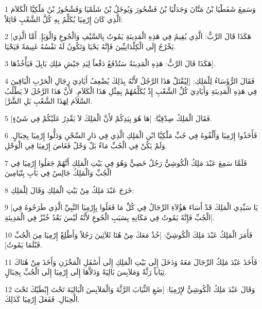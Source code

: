\par 1 وَسَمِعَ شَفَطْيَا بْنُ مَتَّانَ وَجَدَلْيَا بْنُ فَشْحُورَ وَيُوخَلُ بْنُ شَلَمْيَا وَفَشْحُورُ بْنُ مَلْكِيَّا الْكَلاَمَ الَّذِي كَانَ إِرْمِيَا يُكَلِّمُ بِهِ كُلَّ الشَّعْبِ قَائِلاً:
\par 2 [هَكَذَا قَالَ الرَّبُّ: الَّذِي يُقِيمُ فِي هَذِهِ الْمَدِينَةِ يَمُوتُ بِالسَّيْفِ وَالْجُوعِ وَالْوَبَإِ. أَمَّا الَّذِي يَخْرُجُ إِلَى الْكِلْدَانِيِّينَ فَإِنَّهُ يَحْيَا وَتَكُونُ لَهُ نَفْسُهُ غَنِيمَةً فَيَحْيَا.
\par 3 هَكَذَا قَالَ الرَّبُّ: هَذِهِ الْمَدِينَةُ سَتُدْفَعُ دَفْعاً لِيَدِ جَيْشِ مَلِكِ بَابِلَ فَيَأْخُذُهَا].
\par 4 فَقَالَ الرُّؤَسَاءُ لِلْمَلِكِ: [لِيُقْتَلْ هَذَا الرَّجُلُ لأَنَّهُ بِذَلِكَ يُضْعِفُ أَيَادِيَ رِجَالِ الْحَرْبِ الْبَاقِينَ فِي هَذِهِ الْمَدِينَةِ وَأَيَادِيَ كُلِّ الشَّعْبِ إِذْ يُكَلِّمُهُمْ بِمِثْلِ هَذَا الْكَلاَمِ. لأَنَّ هَذَا الرَّجُلَ لاَ يَطْلُبُ السَّلاَمَ لِهَذَا الشَّعْبِ بَلِ الشَّرَّ].
\par 5 فَقَالَ الْمَلِكُ صِدْقِيَّا: [هَا هُوَ بِيَدِكُمْ لأَنَّ الْمَلِكَ لاَ يَقْدِرُ عَلَيْكُمْ فِي شَيْءٍ].
\par 6 فَأَخَذُوا إِرْمِيَا وَأَلْقُوهُ فِي جُبِّ مَلْكِيَّا ابْنِ الْمَلِكِ الَّذِي فِي دَارِ السِّجْنِ وَدَلُّوا إِرْمِيَا بِحِبَالٍ. وَلَمْ يَكُنْ فِي الْجُبِّ مَاءٌ بَلْ وَحْلٌ فَغَاصَ إِرْمِيَا فِي الْوَحْلِ.
\par 7 فَلَمَّا سَمِعَ عَبْدَ مَلِكُ الْكُوشِيُّ رَجُلٌ خَصِيٌّ وَهُوَ فِي بَيْتِ الْمَلِكِ أَنَّهُمْ جَعَلُوا إِرْمِيَا فِي الْجُبِّ وَالْمَلِكُ جَالِسٌ فِي بَابِ بِنْيَامِينَ
\par 8 خَرَجَ عَبْدَ مَلِكُ مِنْ بَيْتِ الْمَلِكِ وَقَالَ لِلْمَلِكِ:
\par 9 [يَا سَيِّدِي الْمَلِكَ قَدْ أَسَاءَ هَؤُلاَءِ الرِّجَالُ فِي كُلِّ مَا فَعَلُوا بِإِرْمِيَا النَّبِيِّ الَّذِي طَرَحُوهُ فِي الْجُبِّ فَإِنَّهُ يَمُوتُ فِي مَكَانِهِ بِسَبَبِ الْجُوعِ لأَنَّهُ لَيْسَ بَعْدُ خُبْزٌ فِي الْمَدِينَةِ].
\par 10 فَأَمَرَ الْمَلِكُ عَبْدَ مَلِكَ الْكُوشِيَّ: [خُذْ مَعَكَ مِنْ هُنَا ثَلاَثِينَ رَجُلاً وَأَطْلِعْ إِرْمِيَا مِنَ الْجُبِّ قَبْلَمَا يَمُوتُ].
\par 11 فَأَخَذَ عَبْدَ مَلِكُ الرِّجَالَ مَعَهُ وَدَخَلَ إِلَى بَيْتِ الْمَلِكِ إِلَى أَسْفَلِ الْمَخْزَنِ وَأَخَذَ مِنْ هُنَاكَ ثِيَاباً رَثَّةً وَمَلاَبِسَ بَالِيَةً وَدَلاَّهَا إِلَى إِرْمِيَا إِلَى الْجُبِّ بِحِبَالٍ.
\par 12 وَقَالَ عَبْدَ مَلِكُ الْكُوشِيُّ لإِرْمِيَا: [ضَعِ الثِّيَابَ الرَّثَّةَ وَالْمَلاَبِسَ الْبَالِيَةَ تَحْتَ إِبْطَيْكَ تَحْتَ الْحِبَالِ. فَفَعَلَ إِرْمِيَا كَذَلِكَ.
